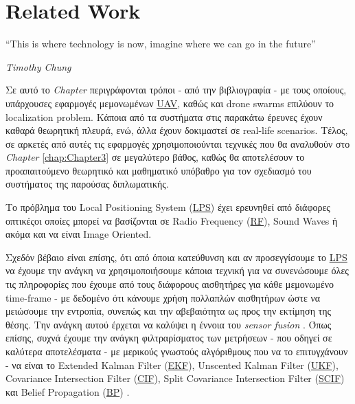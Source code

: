 \chapter{Related Work} \label{chap:Chapter2}       
\epigraph{``This is where technology is now, imagine where we can go in the future” }{\textit{Timothy Chung}}

Σε αυτό το \emph{Chapter} περιγράφονται τρόποι - από την βιβλιογραφία - με τους οποί\-ους, υπάρχουσες εφαρμογές 
μεμονωμένων \hyperref[abbr:UAV]{UAV}, καθώς και drone swarms επιλύουν το localization pro\-blem. Κάποια από τα συστήματα στις παρακάτω έρευνες έχουν καθαρά
θεωρητική πλευρά, ενώ, άλλα έχουν δοκιμαστεί σε real-life scenarios.
Τέλος, σε α\-ρκε\-τές από αυτές τις εφαρμογές χρησιμοποιούνται τεχνικές που θα αναλυθούν στο \emph{Chapter} \ref{chap:Chapter3} 
σε μεγαλύτερο βάθος, καθώς θα αποτελέσουν το προαπαιτούμενο θεωρητικό και μαθηματικό υπόβαθρο για τον σχεδιασμό του συστήματος της παρούσας διπλωματικής.


Το πρόβλημα του Local Positioning System 
(\hyperref[abbr:LPS]{LPS}) \cite{lps} έχει ερευνηθεί από διάφορες οπτικές\udot οι οποίες μπορεί να βασίζονται σε Radio Frequency
(\hyperref[abbr:RF]{RF}), Sound Waves ή ακόμα και να είναι Image Oriented.

Σχεδόν βέβαιο είναι επίσης, ότι από όποια κατεύθυνση και αν προσεγγίσουμε το \hyperref[abbr:LPS]{LPS} να έχουμε την ανάγκη να 
χρησιμοποιήσουμε κάποια τεχνική για να συνενώσουμε όλες τις πληροφορίες που έχουμε από τους διάφορους αισθητήρες για κάθε μεμονωμένο 
time-frame - με δεδομένο ότι κάνουμε χρήση πολλαπλών αισθητήρων ώστε να μειώσουμε την εντροπία, συνεπώς και την αβεβαιότητα ως 
προς την εκτίμηση της θέσης. 
Την ανάγκη αυτού έρχεται να καλύψει η έννοια του \emph{sensor fusion} \cite{sensor-fusion}. Όπως επίσης, συχνά 
έχουμε την ανάγκη φιλτραρίσματος των μετρήσεων - που οδηγεί σε καλύτερα αποτελέσματα - με μερικούς γνωστούς 
αλγόριθμους που να το επιτυγχάνουν - να είναι το  
Extended Kalman Filter (\hyperref[abbr:EKF]{EKF}), Unscented Kalman Filter (\hyperref[abbr:UKF]{UKF}), Covariance Intersection  
Filter (\hyperref[abbr:CIF]{CIF}),  Split  Covariance  Intersection  Filter (\hyperref[abbr:SCIF]{SCIF}) και  Belief  Propagation 
(\hyperref[abbr:BP]{BP}) \cite{fusion-filters}. 

